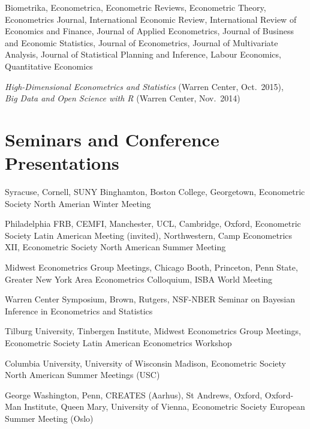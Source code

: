 \documentclass[line,overlapped]{myres}
\begin{document}
\begin{resume}
\begin{description}[style=multiline,leftmargin=3cm,font=\normalfont]
  \item[Refereeing:] Biometrika, Econometrica, Econometric Reviews, Econometric Theory, Econometrics Journal, International Economic Review, International Review of Economics and Finance, Journal of Applied Econometrics, Journal of Business and Economic Statistics, Journal of Econometrics, Journal of Multivariate Analysis, Journal of Statistical Planning and Inference, Labour Economics, Quantitative Economics 
  \item[Workshops \\ Organized:]
    \emph{High-Dimensional Econometrics and Statistics} (Warren Center, Oct.\ 2015), \\
    \emph{Big Data and Open Science with R} (Warren Center, Nov.\ 2014)
\end{description}



\section{\sc Seminars and Conference Presentations}

\begin{description}[style=multiline,leftmargin=2cm,font=\normalfont]
  \item[2017--2018:] Syracuse, Cornell, SUNY Binghamton, Boston College, Georgetown, Econometric Society North Amerian Winter Meeting
\item[2016--2017:] Philadelphia FRB, CEMFI, Manchester, UCL, Cambridge, Oxford, Econometric Society Latin American Meeting (invited), Northwestern, Camp Econometrics XII, Econometric Society North American Summer Meeting
\item[2015--2016:] Midwest Econometrics Group Meetings, Chicago Booth, Princeton, Penn State, Greater New York Area Econometrics Colloquium, ISBA World Meeting 
\item[2014--2015:] Warren Center Symposium, Brown, Rutgers, NSF-NBER Seminar on Bayesian Inference in Econometrics and Statistics 
\item[2013--2014:] Tilburg University, Tinbergen Institute, Midwest Econometrics Group Meetings, Econometric Society Latin American Econometrics Workshop
\item[2012--2013:] Columbia University, University of Wisconsin Madison, Econometric Society North American Summer Meetings (USC)
\item[2011--2012:] George Washington, Penn, CREATES (Aarhus), St Andrews, Oxford, Oxford-Man Institute, Queen Mary, University of Vienna, Econometric Society European Summer Meeting (Oslo)
\end{description}



\end{resume}
\end{document}
